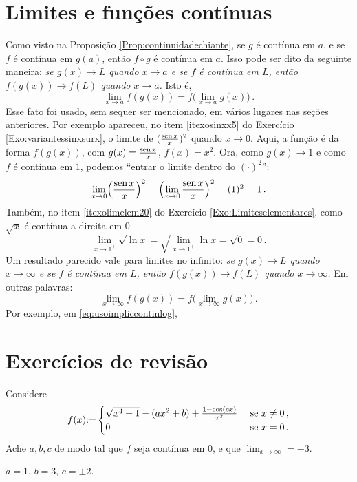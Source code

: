 \section{Limites e funções contínuas}\label{Sec:FuncConteLim}
Como visto na Proposição \ref{Prop:continuidadechiante}, se 
$g$ é contínua em $a$, e se $f$ é contínua em $g(a)$, então $f\circ g$ é
contínua em $a$. Isso pode ser dito da seguinte maneira: \emph{se $g(x)\to L$
quando $x\to a$ e se $f$ é contínua em $L$, então $f(g(x))\to f(L)$ quando
$x\to a$.} Isto é,
$$\lim_{x\to a}f(g(x))= f\bigl(\lim_{x\to a}g(x)\bigr)\,.$$
Esse fato foi usado, sem sequer ser mencionado, em vários lugares nas seções
anteriores. Por exemplo apareceu, no item \eqref{itexosinxx5}
do Exercício \ref{Exo:variantessinxsurx}, o limite de $(\frac{\operatorname{sen}
x}{x})^2$ quando $x\to 0$. Aqui, a função é da forma $f(g(x))$, com
$g(x)=\frac{\operatorname{sen} x}{x}$, $f(x)=x^2$. Ora, como $g(x)\to 1$ e como $f$ é
contínua em $1$, podemos ``entrar o limite dentro do $(\cdot)^2$'':
$$
\lim_{x\to 0}\Bigl(
\frac{\operatorname{sen} x}{x}
\Bigr)^2=\Bigl(\lim_{x\to 0}
\frac{\operatorname{sen} x}{x}
\Bigr)^2=(1)^2=1\,.
$$
Também, no item \eqref{itexolimelem20} do Exercício
\ref{Exo:Limiteselementares}, como $\sqrt{x}$ é contínua a direita em $0$
$$
\lim_{x\to 1^+}\sqrt{\ln x}=\sqrt{\lim_{x\to 1^+}{\ln x}}=\sqrt{0}=0\,.
$$
Um resultado parecido vale para limites no infinito:  \emph{se $g(x)\to L$
quando $x\to \infty$ e se $f$ é contínua em $L$, então $f(g(x))\to f(L)$
quando $x\to \infty$.} Em outras palavras:
$$\lim_{x\to \infty}f(g(x))= f\bigl(\lim_{x\to \infty}g(x)\bigr)\,.$$
Por exemplo, em \eqref{eq:usoimpliccontinlog}, 

\section{Exercícios de revisão}

\begin{exo}
Considere 
$$
f(x){:=}
\begin{cases}
\sqrt{x^4+1}-(ax^2+b)+\frac{1-\cos (cx)}{x^2} &\text{ se }x\neq 0 \,,\\
0  & \text{ se }x=0\,.
\end{cases}
$$
Ache $a,b,c$ de modo tal que $f$ seja contínua em $0$, e que $\lim_{x\to \infty}=-3$.
\begin{sol}
$a=1$, $b=3$, $c=\pm 2$.
\end{sol}
\end{exo}


